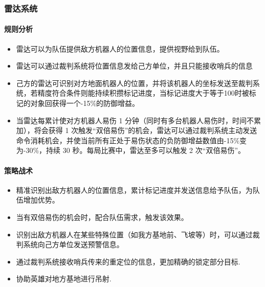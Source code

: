 

\subsubsection{雷达系统}

    \paragraph{规则分析}


    \begin{itemize}
        \item 雷达可以为队伍提供敌方机器人的位置信息，提供视野给到队伍。
        \item 雷达可以通过裁判系统将位置信息发给己方单位，并且只能接收哨兵的信息
        \item 己方的雷达可识别对方地面机器人的位置，并将该机器人的坐标发送至裁判系统，若精度符合条件则能持续积攒标记进度，当标记进度大于等于100时被标记的对象回获得一个-15\%的防御增益。
        \item 当雷达每累计使对方机器人易伤 1 分钟（同时有多台机器人易伤时，时间不累加），将会获得 1 次触发“双倍易伤”的机会，雷达可以通过裁判系统主动发送命令消耗机会，并使当前所有正处于易伤状态的负防御增益数值由-15\%变为-30\%，持续 30 秒。每局比赛中，雷达至多可以触发 2 次“双倍易伤”。
    \end{itemize}

    \paragraph{策略战术}


    \begin{itemize}
        \item 精准识别出敌方机器人的位置信息，累计标记进度并发送信息给予队伍，为队伍增加优势。
        \item 当有双倍易伤的机会时，配合队伍需求，触发该效果。
        \item 识别出敌方机器人在某些特殊位置（如我方基地前、飞坡等）时，可以通过裁判系统向己方单位发送预警信息。
        \item 通过裁判系统接收哨兵传来的重定位的信息，更加精确的锁定部分目标.
        \item 协助英雄对地方基地进行吊射.
    \end{itemize}
    
